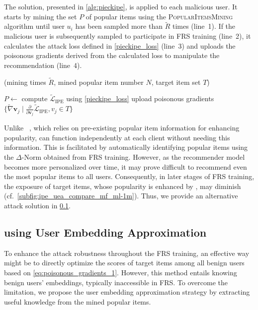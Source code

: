The \modelI{} solution, presented in \cref{alg:pieckipe}, is applied to each malicious user.
It starts by mining the set ${P}$ of popular items using the \textsc{PopularItemsMining} algorithm until user $u_i$ has been sampled more than $\tilde{R}$ times (line~1).
If the malicious user is subsequently sampled to participate in FRS training (line~2), it calculates the attack loss defined in \cref{pieckipe_loss} (line~3) and uploads the poisonous gradients derived from the calculated loss to manipulate the recommendation (line~4).

\begin{algorithm}
\caption{\modelI{} (mining times $\tilde{R}$, mined popular item number $N$, target item set ${T}$)}
\label{alg:pieckipe}
\begin{algorithmic}[1]
\State ${P} \gets$  
    \State compute $\tilde{\mathcal{L}}_\text{IPE}$ using \cref{pieckipe_loss}
    \State upload poisonous gradients $\{ \tilde{\nabla}{\mathbf{v}}_j \mid \frac{\partial}{\partial \mathbf{v}_j} \tilde{\mathcal{L}}_\text{IPE},v_j \in {T} \}$
\EndWhile
\end{algorithmic}
\end{algorithm}

Unlike \PIP{}~\cite{pipattack}, which relies on pre-existing popular item information for enhancing popularity, \modelI{} can function independently at each client without needing this information. This is facilitated by automatically identifying popular items using the $\Delta$-Norm obtained from FRS training. However, as the recommender model becomes more personalized over time, it may prove difficult to recommend even the most popular items to all users. Consequently, in later stages of FRS training, the exposure of target items, whose popularity is enhanced by \modelI{}, may diminish (cf.\ \cref{subfig:ipe_uea_compare_mf_ml-1m}).
Thus, we provide an alternative attack solution in \cref{ssec:user_embed_app}.

\subsection{\modelII{} using User Embedding Approximation}
\label{ssec:user_embed_app}

To enhance the attack robustness throughout the FRS training, an effective way might be to directly optimize the scores of target items among all benign users based on \cref{eq:poisonous_gradients_1}.
However, this method entails knowing benign users' embeddings, typically inaccessible in FRS.
To overcome the limitation, we propose the user embedding approximation strategy by extracting useful knowledge from the mined popular items.

